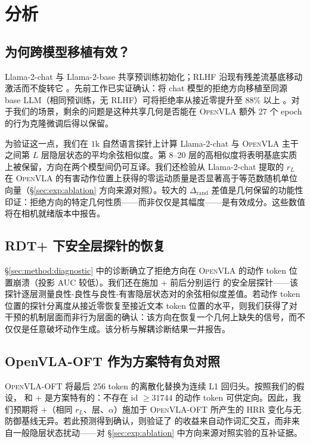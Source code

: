 \section{分析}
\label{sec:analysis}

\subsection{为何跨模型移植有效？}
\label{sec:analysis:crossmodel}

Llama-2-chat 与 Llama-2-base 共享预训练初始化；RLHF 沿现有残差流基底移动激活而不旋转它 \cite{arditi2024refusal}。先前工作已实证确认：将 chat 模型的拒绝方向移植至同源 base LLM（相同预训练，无 RLHF）可将拒绝率从接近零提升至 88\% 以上 \cite{baselmsrefuse2024}。对于我们的场景，剩余的问题是这种共享几何是否能在 \textsc{OpenVLA} 额外 27 个 epoch 的行为克隆微调后得以保留。

为验证这一点，我们在 $1\mathrm{k}$ 自然语言探针上计算 Llama-2-chat 与 \textsc{OpenVLA} 主干之间第 $L$ 层隐层状态的平均余弦相似度。第 8--20 层的高相似度将表明基底实质上被保留，方向在两个模型间仍可互译。我们还检验从 Llama-2-chat 提取的 $r_L$ 在 \textsc{OpenVLA} 的有害动作位置上获得的零运动质量是否显著高于等范数随机单位向量（\S\ref{sec:exp:ablation} 方向来源对照）。较大的 $\Delta_{\text{rand}}$ 差值是几何保留的功能性印证：拒绝方向的特定几何性质——而非仅仅是其幅度——是有效成分。这些数值将在相机就绪版本中报告。

\subsection{RDT{}+ 下安全层探针的恢复}
\label{sec:analysis:probe-recovery}

\S\ref{sec:method:diagnostic} 中的诊断确立了拒绝方向在 \textsc{OpenVLA} 的动作 token 位置崩溃（投影 AUC 较低）。我们还在施加 \method{}+ 前后分别运行 \citet{securitytensors2025} 的安全层探针——该探针逐层测量良性-良性与良性-有害隐层状态对的余弦相似度差值。若动作 token 位置的探针分离度从接近零恢复至接近文本 token 位置的水平，则我们获得了对干预的机制层面而非行为层面的确认：该方向在恢复一个几何上缺失的信号，而不仅仅是任意破坏动作生成。该分析与解耦诊断结果一并报告。

\subsection{OpenVLA-OFT 作为方案特有负对照}
\label{sec:analysis:oft}

\textsc{OpenVLA-OFT} \cite{openvlaoft2025} 将最后 256 token 的离散化替换为连续 L1 回归头。按照我们的假设，\method{} 和 \method{}+ 是方案特有的：不存在 id $\geq 31744$ 的动作 token 可供定向。因此，我们预期将 \method{}+（相同 $r_L$、层、$\alpha$）施加于 \textsc{OpenVLA-OFT} 所产生的 HRR 变化与无防御基线无异。若此预测得到确认，则验证了 \method{} 的收益来自动作词汇交互，而非来自一般隐层状态扰动——对 \S\ref{sec:exp:ablation} 中方向来源对照实验的互补证据。

